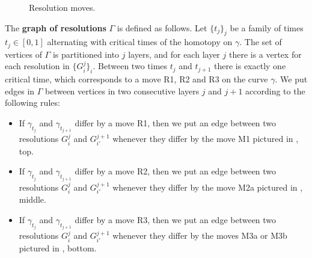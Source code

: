 \documentclass{article}
\newcommand{\control}[2]{ ($#2+#1$) .. #1}
\begin{document}
\begin{figure}[ht]
\begin{center}
\caption{Resolution moves.}
\label{pic_resolution_moves}
\end{center}
\end{figure}

The \textbf{graph of resolutions} $\Gamma$ is defined as follows. Let $\{ t_j \}_j$ be a family of times $t_j \in [0,1]$ alternating with critical times of the homotopy on $\gamma$. The set of vertices of $\Gamma$ is partitioned into $j$ layers, and for each layer $j$ there is a vertex for each resolution in $\{ G^j_i \}_i$. Between two times $t_j$ and $t_{j+1}$ there is exactly one critical time, which corresponds to a move R1, R2 and R3 on the curve $\gamma$. We put edges in $\Gamma$ between vertices in two consecutive layers $j$ and $j+1$ according to the following rules:
\begin{itemize}
\item If $\gamma_{t_j}$ and $\gamma_{t_{j+1}}$ differ by a move R1, then we put an edge between two resolutions $G^j_i$ and $G^{j+1}_{i'}$ whenever they differ by the move M1 pictured in , top.

\item If $\gamma_{t_j}$ and $\gamma_{t_{j+1}}$ differ by a move R2, then we put an edge between two resolutions $G^j_i$ and $G^{j+1}_{i'}$ whenever they differ by the move M2a pictured in , middle. 

\item If $\gamma_{t_j}$ and $\gamma_{t_{j+1}}$ differ by a move R3, then we put an edge between two resolutions $G^j_i$ and $G^{j+1}_{i'}$ whenever they differ by the moves M3a or M3b pictured in , bottom.
  \end{itemize}
\end{document}
